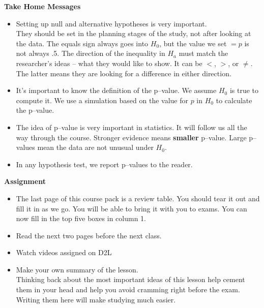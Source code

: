 {\bf Take Home Messages}
\begin{itemize}
  \item Setting up null and alternative hypotheses is very
    important.\\
    They should be set in the planning stages of the study, not after
    looking at the data. 
    The equals sign always goes into $H_0$, but the value we set $ = p$ is not
    always .5.  The direction of the inequality in $H_a$ must match
    the researcher's ideas -- what they would like to show. It can be
    $<$, $>$, or $\neq$.  The latter means they are looking for a
    difference in either direction.
  \item It's important to know the definition of the p--value. We
    assume $H_0$ is true to compute it.  We  use a simulation based
    on the  value for $p$  in $H_0$ to calculate the p--value.    
  \item The idea of p--value is very important in statistics. It will
    follow us all the way through the course. Stronger evidence means
    {\bf smaller} p--value.  Large p--values mean the data are not
    unusual under $H_0$.
  \item In any hypothesis test, we report p--values to the reader.  
\end{itemize}\vfill

{\bf Assignment}
\begin{itemize}
\item The last page of this course pack  is a review table. You should
  tear it out and fill it in as we go. You will be able to bring it
  with you to exams.  You can now fill in the top five boxes  in column 1.
\item Read the next two pages before the next class.
\item Watch videos assigned on D2L   
 \item 
  Make your own summary of the lesson. \\
  Thinking back about the most important ideas of this lesson help
  cement them in your head and help you avoid cramming right before
  the exam.  Writing them here will make studying much easier.   
\end{itemize}


